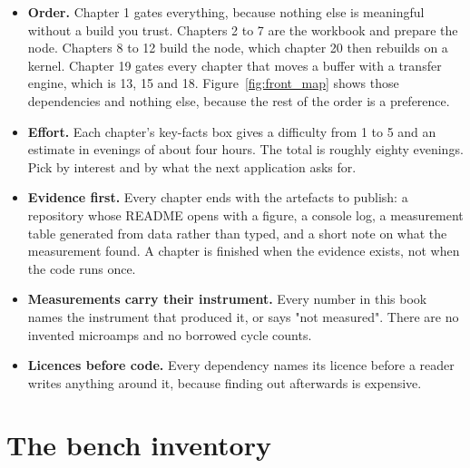 \begin{itemize}
\item \textbf{Order.} Chapter 1 gates everything, because nothing else is meaningful without a build you trust. Chapters 2 to 7 are the workbook and prepare the node. Chapters 8 to 12 build the node, which chapter 20 then rebuilds on a kernel. Chapter 19 gates every chapter that moves a buffer with a transfer engine, which is 13, 15 and 18. Figure~\ref{fig:front_map} shows those dependencies and nothing else, because the rest of the order is a preference.
\item \textbf{Effort.} Each chapter's key-facts box gives a difficulty from 1 to 5 and an estimate in evenings of about four hours. The total is roughly eighty evenings. Pick by interest and by what the next application asks for.
\item \textbf{Evidence first.} Every chapter ends with the artefacts to publish: a repository whose README opens with a figure, a console log, a measurement table generated from data rather than typed, and a short note on what the measurement found. A chapter is finished when the evidence exists, not when the code runs once.
\item \textbf{Measurements carry their instrument.} Every number in this book names the instrument that produced it, or says "not measured". There are no invented microamps and no borrowed cycle counts.
\item \textbf{Licences before code.} Every dependency names its licence before a reader writes anything around it, because finding out afterwards is expensive.
\end{itemize}


\section*{The bench inventory}

